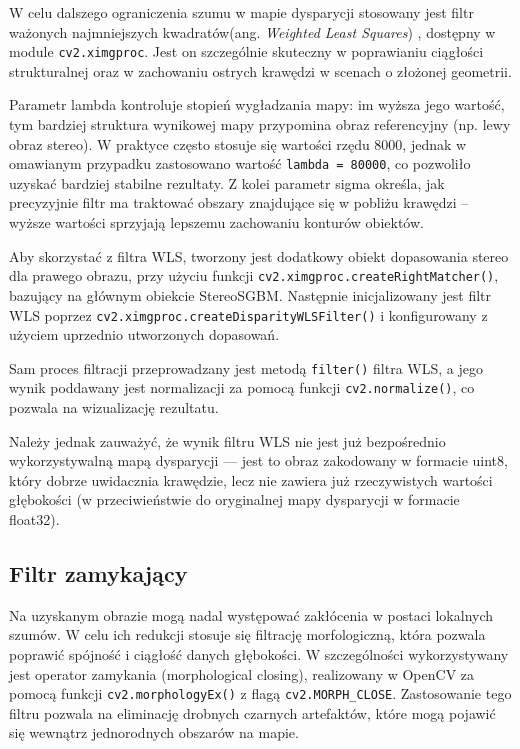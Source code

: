 \documentclass[magisterska]{pracadypl}
\begin{document}
W celu dalszego ograniczenia szumu w mapie dysparycji stosowany jest filtr ważonych najmniejszych kwadratów(ang. \textit{Weighted Least Squares}) \cite{wls}, dostępny w module \texttt{cv2.ximgproc}. Jest on szczególnie skuteczny w poprawianiu ciągłości strukturalnej oraz w zachowaniu ostrych krawędzi w scenach o złożonej geometrii.

Parametr lambda kontroluje stopień wygładzania mapy: im wyższa jego wartość, tym bardziej struktura wynikowej mapy przypomina obraz referencyjny (np. lewy obraz stereo). W praktyce często stosuje się wartości rzędu 8000, jednak w omawianym przypadku zastosowano wartość \texttt{lambda = 80000}, co pozwoliło uzyskać bardziej stabilne rezultaty. Z kolei parametr sigma określa, jak precyzyjnie filtr ma traktować obszary znajdujące się w pobliżu krawędzi – wyższe wartości sprzyjają lepszemu zachowaniu konturów obiektów.

Aby skorzystać z filtra WLS, tworzony jest dodatkowy obiekt dopasowania stereo dla prawego obrazu, przy użyciu funkcji \texttt{cv2.ximgproc.createRightMatcher()}, bazujący na głównym obiekcie StereoSGBM. Następnie inicjalizowany jest filtr WLS poprzez \texttt{cv2.ximgproc.\allowbreak createDisparityWLSFilter()} i konfigurowany z użyciem uprzednio utworzonych dopasowań.

Sam proces filtracji przeprowadzany jest metodą \texttt{filter()} filtra WLS, a jego wynik poddawany jest normalizacji za pomocą funkcji \texttt{cv2.normalize()}, co pozwala na wizualizację rezultatu.

Należy jednak zauważyć, że wynik filtru WLS nie jest już bezpośrednio wykorzystywalną mapą dysparycji — jest to obraz zakodowany w formacie uint8, który dobrze uwidacznia krawędzie, lecz nie zawiera już rzeczywistych wartości głębokości (w przeciwieństwie do oryginalnej mapy dysparycji w formacie float32).

\subsection{Filtr zamykający}

Na uzyskanym obrazie mogą nadal występować zakłócenia w postaci lokalnych szumów. W celu ich redukcji stosuje się filtrację morfologiczną, która pozwala poprawić spójność i ciągłość danych głębokości. W szczególności wykorzystywany jest operator zamykania (morphological closing), realizowany w OpenCV za pomocą funkcji \texttt{cv2.morphologyEx()} z flagą \texttt{cv2.MORPH\_CLOSE}. Zastosowanie tego filtru pozwala na eliminację drobnych czarnych artefaktów, które mogą pojawić się wewnątrz jednorodnych obszarów na mapie.
\end{document}

